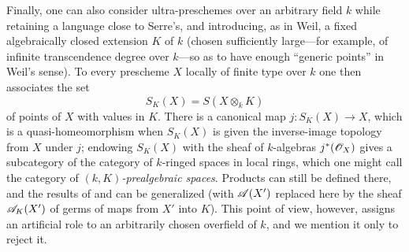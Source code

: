 \begin{env}[10.10.5]
\label{IV.10.10.5}
Finally, one can also consider ultra-preschemes over an arbitrary field $k$ while
retaining a language close to Serre's, and introducing, as in Weil, a fixed
algebraically closed extension $K$ of $k$ (chosen sufficiently large---for example,
of infinite transcendence degree over $k$---so as to have enough ``generic points''
in Weil's sense).
To every prescheme $X$ locally of finite type over $k$ one then associates the set
\[
 S_K(X)=S(X\otimes_k K)
\]
of points of $X$ with values in $K$.
There is a canonical map $j:S_K(X)\to X$, which is a quasi-homeomorphism when
$S_K(X)$ is given the inverse-image topology from $X$ under $j$; endowing $S_K(X)$
with the sheaf of $k$-algebras $j^*(\mathscr{O}_X)$ gives a subcategory of the category
of $k$-ringed spaces in local rings, which one might call the category of
\emph{$(k,K)$-prealgebraic spaces}.
Products can still be defined there, and the results of  and
 can be generalized (with $\mathscr{A}(X')$ replaced here by the sheaf
$\mathscr{A}_K(X')$ of germs of maps from $X'$ into $K$).
This point of view, however, assigns an artificial role to an arbitrarily chosen
overfield of $k$, and we mention it only to reject it.
\end{env}
